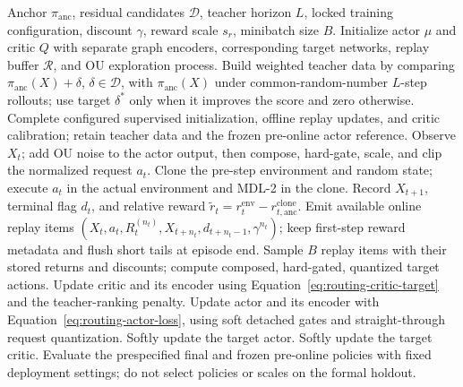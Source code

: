 \documentclass[preprint,review,12pt]{elsarticle}
\begin{document}
\begin{algorithm}[p]
\footnotesize
\caption{Routing-primary AFR-GCN--DDPG training and fixed-checkpoint evaluation.}
\label{alg:ddpg_gcn}
\begin{algorithmic}[1]
\Require Anchor $\pi_{\mathrm{anc}}$, residual candidates $\mathcal{D}$, teacher horizon $L$, locked training configuration, discount $\gamma$, reward scale $s_r$, minibatch size $B$.
\State Initialize actor $\mu$ and critic $Q$ with separate graph encoders, corresponding target networks, replay buffer $\mathcal{R}$, and OU exploration process.
\State Build weighted teacher data by comparing $\pi_{\mathrm{anc}}(X)+\delta$, $\delta\in\mathcal{D}$, with $\pi_{\mathrm{anc}}(X)$ under common-random-number $L$-step rollouts; use target $\delta^*$ only when it improves the score and zero otherwise.
\State Complete configured supervised initialization, offline replay updates, and critic calibration; retain teacher data and the frozen pre-online actor reference.
    \State Observe $X_t$; add OU noise to the actor output, then compose, hard-gate, scale, and clip the normalized request $a_t$.
    \State Clone the pre-step environment and random state; execute $a_t$ in the actual environment and MDL-2 in the clone.
    \State Record $X_{t+1}$, terminal flag $d_t$, and relative reward $\widetilde r_t=r_t^{\mathrm{env}}-r_{t,\mathrm{anc}}^{\mathrm{clone}}$.
    \State Emit available online replay items $(X_t,a_t,R_t^{(n_t)},X_{t+n_t},d_{t+n_t-1},\gamma^{n_t})$; keep first-step reward metadata and flush short tails at episode end.
        \State Sample $B$ replay items with their stored returns and discounts; compute composed, hard-gated, quantized target actions.
        \State Update critic and its encoder using Equation~\eqref{eq:routing-critic-target} and the teacher-ranking penalty.
            \State Update actor and its encoder with Equation~\eqref{eq:routing-actor-loss}, using soft detached gates and straight-through request quantization.
            \State Softly update the target actor.
        \EndIf
        \State Softly update the target critic.
    \EndIf
\EndFor
\State Evaluate the prespecified final and frozen pre-online policies with fixed deployment settings; do not select policies or scales on the formal holdout.
\end{algorithmic}
\end{algorithm}
\end{document}
